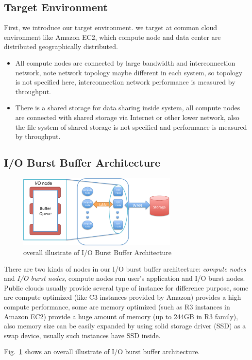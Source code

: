 \subsection{Target Environment}
First, we introduce our target environment.
we target at common cloud environment like Amazon EC2, which compute node and data center are distributed geographically distributed.

\begin{itemize}
	\item All compute nodes are connected by large bandwidth and interconnection network, note network topology maybe different in each system, so topology is not specified here, interconnection network performance is measured by throughput.
	\item There is a shared storage for data sharing inside system, all compute nodes are connected
	with shared storage via Internet or other lower network, also the file system of shared storage is not specified and performance is measured by throughput.
\end{itemize}

\subsection{I/O Burst Buffer Architecture}

\begin{figure}[tb]
	\centering
	\includegraphics[width=8cm]{img/architecture_overview}
	\caption{overall illustrate of I/O Burst Buffer Architecture}
	\label{architecture:overview}
\end{figure}

There are two kinds of nodes in our I/O burst buffer architecture: \emph{compute nodes} and \emph{I/O burst nodes}, compute nodes run user's application and I/O burst nodes.
Public clouds usually provide several type of instance for difference purpose, some are compute
optimized (like C3 instances provided by Amazon) provides a high compute performance, some are memory optimized (such as R3 instances in Amazon EC2) provide a huge amount of memory (up
to 244GB in R3 family), also memory size can be easily expanded by using solid storage driver (SSD)
as a swap device, usually such instances have SSD inside.

Fig.~\ref{architecture:overview} shows an overall illustrate of I/O burst buffer architecture.